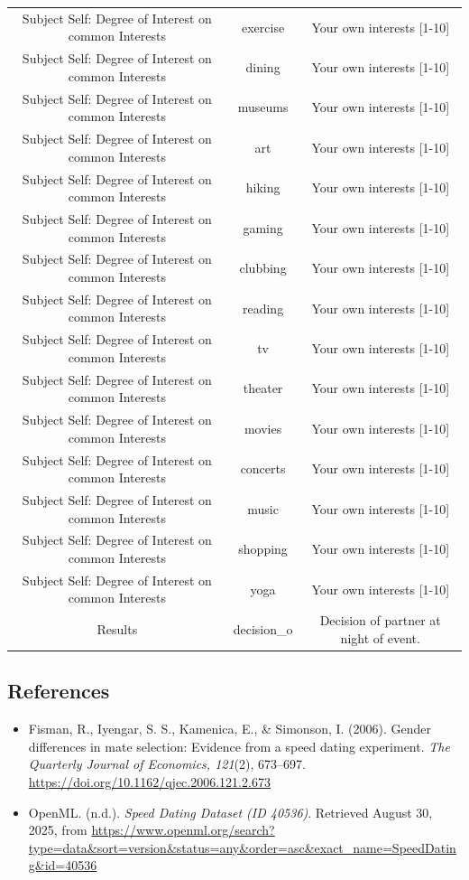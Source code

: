 \documentclass[
  letterpaper,
  DIV=11,
  numbers=noendperiod]{scrartcl}
\begin{document}
\begin{table}
\begin{tabular*}{\linewidth}{@{\extracolsep{\fill}}ccc}
Subject Self: Degree of Interest on common Interests & exercise & Your own interests [1-10] \\ 
Subject Self: Degree of Interest on common Interests & dining & Your own interests [1-10] \\ 
Subject Self: Degree of Interest on common Interests & museums & Your own interests [1-10] \\ 
Subject Self: Degree of Interest on common Interests & art & Your own interests [1-10] \\ 
Subject Self: Degree of Interest on common Interests & hiking & Your own interests [1-10] \\ 
Subject Self: Degree of Interest on common Interests & gaming & Your own interests [1-10] \\ 
Subject Self: Degree of Interest on common Interests & clubbing & Your own interests [1-10] \\ 
Subject Self: Degree of Interest on common Interests & reading & Your own interests [1-10] \\ 
Subject Self: Degree of Interest on common Interests & tv & Your own interests [1-10] \\ 
Subject Self: Degree of Interest on common Interests & theater & Your own interests [1-10] \\ 
Subject Self: Degree of Interest on common Interests & movies & Your own interests [1-10] \\ 
Subject Self: Degree of Interest on common Interests & concerts & Your own interests [1-10] \\ 
Subject Self: Degree of Interest on common Interests & music & Your own interests [1-10] \\ 
Subject Self: Degree of Interest on common Interests & shopping & Your own interests [1-10] \\ 
Subject Self: Degree of Interest on common Interests & yoga & Your own interests [1-10] \\ 
Results & decision\_o & Decision of partner at night of event. \\ 
\bottomrule
\end{tabular*}
\end{table}

\subsection{References}\label{references}

\begin{itemize}
\item
  Fisman, R., Iyengar, S. S., Kamenica, E., \& Simonson, I. (2006).
  Gender differences in mate selection: Evidence from a speed dating
  experiment. \emph{The Quarterly Journal of Economics, 121}(2),
  673--697. \url{https://doi.org/10.1162/qjec.2006.121.2.673}
\item
  OpenML. (n.d.). \emph{Speed Dating Dataset (ID 40536)}. Retrieved
  August 30, 2025, from
  \url{https://www.openml.org/search?type=data&sort=version&status=any&order=asc&exact_name=SpeedDating&id=40536}
\end{itemize}
\end{document}
